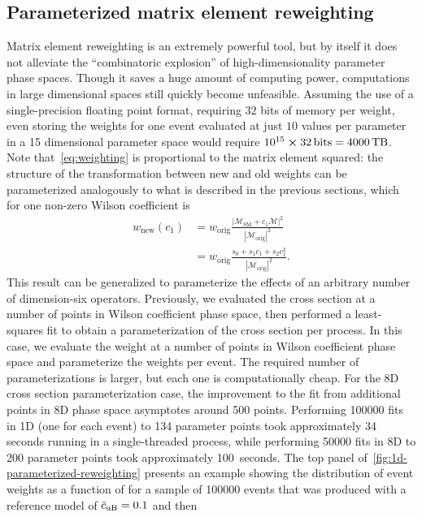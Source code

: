 \subsection{Parameterized matrix element reweighting}
\label{ssec:parameterized-reweighting}
Matrix element reweighting is an extremely powerful tool, but by itself it does
not alleviate the ``combinatoric explosion'' of high-dimensionality parameter
phase spaces. Though it saves a huge amount of computing power, computations in
large dimensional spaces still quickly become unfeasible. Assuming the use of a
single-precision floating point format, requiring $32$ bits of memory per
weight, even storing the weights for one event evaluated at just $10$ values per
parameter in a 15 dimensional parameter space would require $10^{15} \cross
\SI{32}{bits} = \SI{4000}{TB}$. Note that~\cref{eq:weighting} is proportional to
the matrix element squared: the structure of the transformation between new and
old weights can be parameterized analogously to what is described in the
previous sections, which for one non-zero Wilson coefficient is
\begin{align}
  w_\text{new}(c_1) &= w_\text{orig} \frac{|\mathcal{M}_\text{SM} + c_1\mathcal{M}|^2}{|\mathcal{M}_\text{orig}|^2} \\
                    &= w_\text{orig} \frac{s_0 + s_1c_1 + s_2c_1^2}{|\mathcal{M}_\text{orig}|^2}.
\end{align}
This result can be generalized to parameterize the effects of an arbitrary
number of dimension-six operators. Previously, we evaluated the cross section at
a number of points in Wilson coefficient phase space, then performed a
least-squares fit to obtain a parameterization of the cross section per process.
In this case, we evaluate the weight at a number of points in Wilson coefficient
phase space and parameterize the weights per event. The required number of
parameterizations is larger, but each one is computationally cheap. For the 8D
cross section parameterization case, the improvement to the fit from additional
points in 8D phase space asymptotes around \num{500} points. Performing
\num{100000} fits in 1D (one for each event) to \num{134} parameter points took
approximately \num{34} seconds running in a single-threaded process, while
performing \num{50000} fits in 8D to \num{200} parameter points took
approximately \SI{100}{seconds}. The top panel
of~\cref{fig:1d-parameterized-reweighting} presents an example showing the
distribution of event weights as a function of \cuB for a sample of \num{100000}
events that was produced with a reference model of $\bar{c}_{\text{uB}}=0.1$ and then

